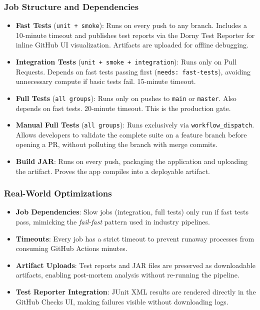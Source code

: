 \documentclass[11pt]{article}
\begin{document}
  \subsubsection{Job Structure and Dependencies}
  \begin{itemize}
    \item \textbf{Fast Tests} (\texttt{unit + smoke}): Runs on every push to any branch. Includes a 10-minute timeout and publishes test reports via the Dorny Test Reporter for inline GitHub UI visualization. Artifacts are uploaded for offline debugging.
    \item \textbf{Integration Tests} (\texttt{unit + smoke + integration}): Runs only on Pull Requests. Depends on fast tests passing first (\texttt{needs: fast-tests}), avoiding unnecessary compute if basic tests fail. 15-minute timeout.
    \item \textbf{Full Tests} (\texttt{all groups}): Runs only on pushes to \texttt{main} or \texttt{master}. Also depends on fast tests. 20-minute timeout. This is the production gate.
    \item \textbf{Manual Full Tests} (\texttt{all groups}): Runs exclusively via \texttt{workflow\_dispatch}. Allows developers to validate the complete suite on a feature branch before opening a PR, without polluting the branch with merge commits.
    \item \textbf{Build JAR}: Runs on every push, packaging the application and uploading the artifact. Proves the app compiles into a deployable artifact.
  \end{itemize}

  \subsubsection{Real-World Optimizations}
  \begin{itemize}
    \item \textbf{Job Dependencies}: Slow jobs (integration, full tests) only run if fast tests pass, mimicking the \textit{fail-fast} pattern used in industry pipelines.
    \item \textbf{Timeouts}: Every job has a strict timeout to prevent runaway processes from consuming GitHub Actions minutes.
    \item \textbf{Artifact Uploads}: Test reports and JAR files are preserved as downloadable artifacts, enabling post-mortem analysis without re-running the pipeline.
    \item \textbf{Test Reporter Integration}: JUnit XML results are rendered directly in the GitHub Checks UI, making failures visible without downloading logs.
  \end{itemize}
\end{document}
